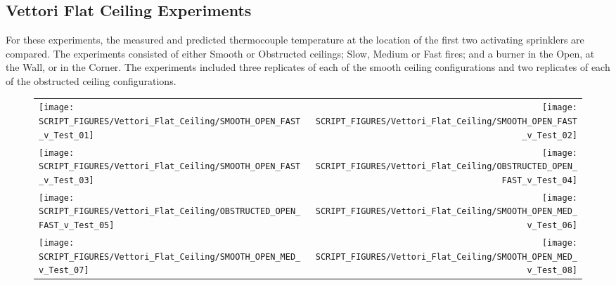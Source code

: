 \clearpage

\subsection{Vettori Flat Ceiling Experiments}
\label{Vettori_Flat_Results}

For these experiments, the measured and predicted thermocouple temperature at the location of the first two activating sprinklers are compared. The experiments consisted of either Smooth or Obstructed ceilings; Slow, Medium or Fast fires; and a burner in the Open, at the Wall, or in the Corner.
The experiments included three replicates of each of the smooth ceiling configurations and two replicates of each of the obstructed ceiling configurations.

\newpage

\begin{figure}[p]
\begin{tabular*}{\textwidth}{l@{\extracolsep{\fill}}r}
\texttt{[image: SCRIPT\_FIGURES/Vettori\_Flat\_Ceiling/SMOOTH\_OPEN\_FAST\_v\_Test\_01]} &
\texttt{[image: SCRIPT\_FIGURES/Vettori\_Flat\_Ceiling/SMOOTH\_OPEN\_FAST\_v\_Test\_02]} \\
\texttt{[image: SCRIPT\_FIGURES/Vettori\_Flat\_Ceiling/SMOOTH\_OPEN\_FAST\_v\_Test\_03]} &
\texttt{[image: SCRIPT\_FIGURES/Vettori\_Flat\_Ceiling/OBSTRUCTED\_OPEN\_FAST\_v\_Test\_04]} \\
\texttt{[image: SCRIPT\_FIGURES/Vettori\_Flat\_Ceiling/OBSTRUCTED\_OPEN\_FAST\_v\_Test\_05]} &
\texttt{[image: SCRIPT\_FIGURES/Vettori\_Flat\_Ceiling/SMOOTH\_OPEN\_MED\_v\_Test\_06]} \\
\texttt{[image: SCRIPT\_FIGURES/Vettori\_Flat\_Ceiling/SMOOTH\_OPEN\_MED\_v\_Test\_07]} &
\texttt{[image: SCRIPT\_FIGURES/Vettori\_Flat\_Ceiling/SMOOTH\_OPEN\_MED\_v\_Test\_08]} \\
\end{tabular*}
\label{Vettori_1}
\end{figure}

